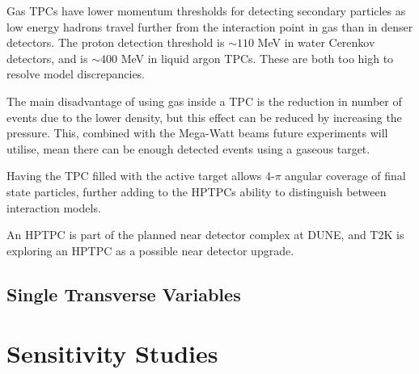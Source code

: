Gas TPCs have lower momentum thresholds for detecting secondary particles as low energy hadrons travel further from the interaction point in gas than in denser detectors. The proton detection threshold is $\sim110$ MeV in water Cerenkov detectors, and is $\sim400$ MeV in liquid argon TPCs. These are both too high to resolve model discrepancies. 

The main disadvantage of using gas inside a TPC is the reduction in number of events due to the lower density, but this effect can be reduced by increasing the pressure. This, combined with the Mega-Watt beams future experiments will utilise, mean there can be enough detected events using a gaseous target.

Having the TPC filled with the active target allows 4-$\pi$ angular coverage of final state particles, further adding to the HPTPCs ability to distinguish between interaction models.

An HPTPC is part of the planned near detector complex at DUNE, and T2K is exploring an HPTPC as a possible near detector upgrade. 

\subsection{Single Transverse Variables}


\section{Sensitivity Studies}
\newpage